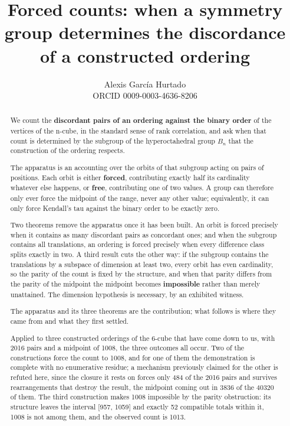 \documentclass[11pt,a4paper]{article}
\title{Forced counts: when a symmetry group determines the discordance of a constructed ordering}
\author{Alexis García Hurtado\\ORCID 0009-0003-4636-8206}
\date{}
\begin{document}
\maketitle

\begin{abstract}
We count the \textbf{discordant pairs of an ordering against the binary order} of the vertices of the n-cube, in the standard sense of rank correlation, and ask when that count is determined by the subgroup of the hyperoctahedral group $B_n$ that the construction of the ordering respects.

The apparatus is an accounting over the orbits of that subgroup acting on pairs of positions. Each orbit is either \textbf{forced}, contributing exactly half its cardinality whatever else happens, or \textbf{free}, contributing one of two values. A group can therefore only ever force the midpoint of the range, never any other value; equivalently, it can only force Kendall's tau against the binary order to be exactly zero.

Two theorems remove the apparatus once it has been built. An orbit is forced precisely when it contains as many discordant pairs as concordant ones; and when the subgroup contains all translations, an ordering is forced precisely when every difference class splits exactly in two. A third result cuts the other way: if the subgroup contains the translations by a subspace of dimension at least two, every orbit has even cardinality, so the parity of the count is fixed by the structure, and when that parity differs from the parity of the midpoint the midpoint becomes \textbf{impossible} rather than merely unattained. The dimension hypothesis is necessary, by an exhibited witness.

The apparatus and its three theorems are the contribution; what follows is where they came from and what they first settled.

Applied to three constructed orderings of the 6-cube that have come down to us, with 2016 pairs and a midpoint of 1008, the three outcomes all occur. Two of the constructions force the count to 1008, and for one of them the demonstration is complete with no enumerative residue; a mechanism previously claimed for the other is refuted here, since the closure it rests on forces only 484 of the 2016 pairs and survives rearrangements that destroy the result, the midpoint coming out in 3836 of the 40320 of them. The third construction makes 1008 impossible by the parity obstruction: its structure leaves the interval [957, 1059] and exactly 52 compatible totals within it, 1008 is not among them, and the observed count is 1013.


\end{abstract}
\end{document}
